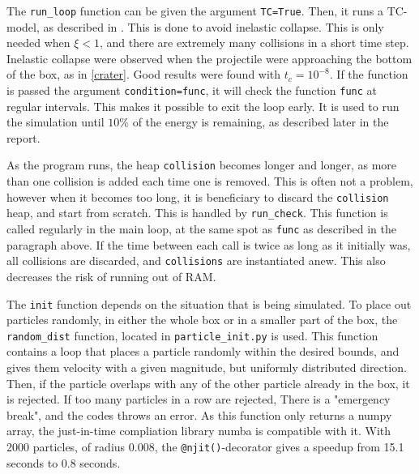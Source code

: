 \documentclass{article}
\begin{document}
    The \verb|run_loop| function can be given the argument \verb|TC=True|. Then, it runs a TC-model, as described in \cite{TC}. This is done to avoid inelastic collapse. This is only needed when $\xi<1$, and there are extremely many collisions in a short time step. Inelastic collapse were observed when the projectile were approaching the bottom of the box, as in \autoref{crater}. Good results were found with $t_c = 10^{-8}$. If the function is passed the argument \verb|condition=func|, it will check the function \verb|func| at regular intervals. This makes it possible to exit the loop early. It is used to run the simulation until $10\%$ of the energy is remaining, as described later in the report.

    As the program runs, the heap \verb|collision| becomes longer and longer, as more than one collision is added each time one is removed. This is often not a problem, however when it becomes too long, it is beneficiary to discard the \verb|collision| heap, and start from scratch. This is handled by \verb|run_check|. This function is called regularly in the main loop, at the same spot as \verb|func| as described in the paragraph above. If the time between each call is twice as long as it initially was, all collisions are discarded, and \verb|collisions| are instantiated anew. This also decreases the risk of running out of RAM.

    The \verb|init| function depends on the situation that is being simulated. To place out particles randomly, in either the whole box or in a smaller part of the box, the \verb|random_dist| function, located in \verb|particle_init.py| is used. This function contains a loop that places a particle randomly within the desired bounds, and gives them velocity with a given magnitude, but uniformly distributed direction. Then, if the particle overlaps with any of the other particle already in the box, it is rejected. If too many particles in a row are rejected, There is a "emergency break", and the codes throws an error. As this function only returns a numpy array, the just-in-time compliation library numba is compatible with it. With 2000 particles, of radius 0.008, the \verb|@njit()|-decorator gives a speedup from 15.1 seconds to 0.8 seconds.
\end{document}
